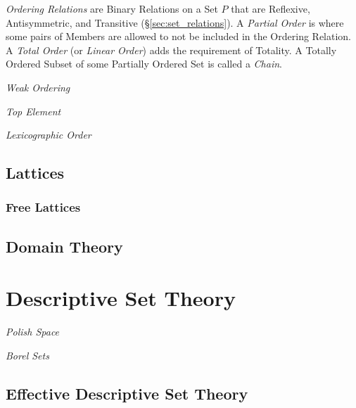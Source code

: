 \documentclass{article}
\begin{document}
\emph{Ordering Relations} are Binary Relations on a Set $P$ that are
Reflexive, Antisymmetric, and Transitive (\S\ref{sec:set_relations}).
A \emph{Partial Order} is where some pairs of Members are allowed to
not be included in the Ordering Relation. A \emph{Total Order} (or
\emph{Linear Order}) adds the requirement of Totality. A Totally
Ordered Subset of some Partially Ordered Set is called a \emph{Chain}.

\emph{Weak Ordering}

\emph{Top Element}

\emph{Lexicographic Order}

\subsection{Lattices}

\subsubsection{Free Lattices}

\subsection{Domain Theory}\label{subsec:domain_theory}

\section{Descriptive Set Theory}

\emph{Polish Space}

\emph{Borel Sets}

\subsection{Effective Descriptive Set Theory}
\end{document}
